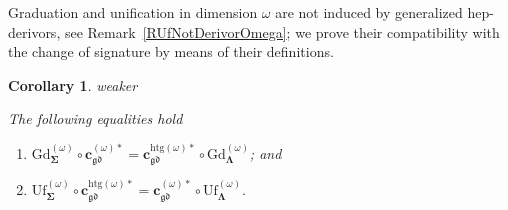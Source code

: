 \documentclass[a4paper, reqno]{amsbook}
\makeatletter
\newcommand{\sig}[1]{\mathbf{#1}}             %
\newcommand{\gd}{\mathfrak{gd}}              %
\newcommand{\htg}{\mathrm{htg}}                %
\newcommand{\Gd}{\mathrm{Gd}}
\newcommand{\Uf}{\mathrm{Uf}}
\theoremstyle{plain}
\newtheorem{corollary}[theorem]{Corollary}
\theoremstyle{definition}
\newcommand*{\CA@leanpending}{}
\newcommand*{\CA@leanrelation}{}
\newcommand*{\lean}[2]{%
  \ifcsname\string\color@lean@#1\endcsname\else
    \PackageError{main}{Unknown relation `#1' in \string\lean}{Use equivalent, weaker or stronger.}%
  \fi
  \gdef\CA@leanrelation{#1}%
  \gdef\CA@leanpending{#2}}
\makeatother
\begin{document}
Graduation and unification in dimension $\omega$ are not induced by generalized hep-derivors, see Remark~\ref{RUfNotDerivorOmega}; we prove their compatibility with the change of signature by means of their definitions.

\begin{corollary}\label{CChangeSigGdUfOmega}\lean{weaker}{ChangeOfSignature.omegaGraduationFunctorChange,ChangeOfSignature.omegaUnificationFunctorChange}
The following equalities hold
\begin{enumerate}
	\item
	$\Gd^{(\omega)}_{\sig{\Sigma}}\circ\mathbf{c}^{(\omega)\ast}_{\gd}=\mathbf{c}^{\htg(\omega)\ast}_{\gd}\circ\Gd^{(\omega)}_{\sig{\Lambda}}$; and

	\item
	$\Uf^{(\omega)}_{\sig{\Sigma}}\circ\mathbf{c}^{\htg(\omega)\ast}_{\gd}=\mathbf{c}^{(\omega)\ast}_{\gd}\circ\Uf^{(\omega)}_{\sig{\Lambda}}$.
\end{enumerate}
\end{corollary}
\end{document}
